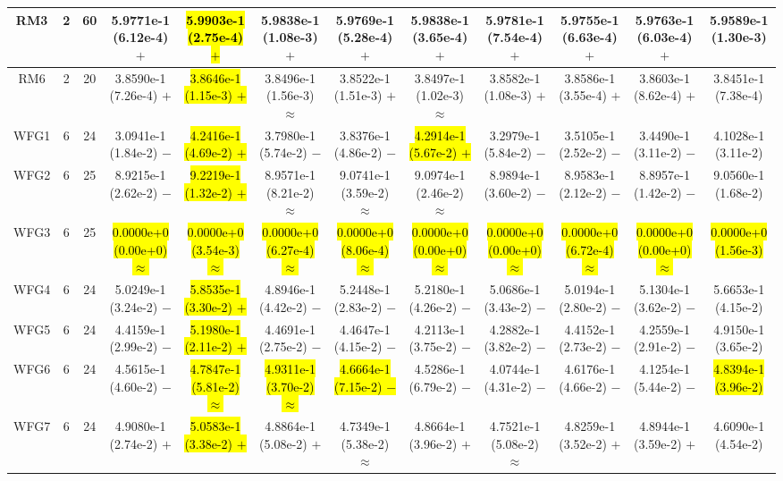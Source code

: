 \documentclass[journal]{IEEEtran}
\begin{document}
\begin{table*}[htbp]
\begin{tabular}{cccccccccccc}
\hline
\multirow{1}{*}{RM3}&2&60&5.9771e-1 (6.12e-4) $+$&\hl{5.9903e-1 (2.75e-4) $+$}&5.9838e-1 (1.08e-3) $+$&5.9769e-1 (5.28e-4) $+$&5.9838e-1 (3.65e-4) $+$&5.9781e-1 (7.54e-4) $+$&5.9755e-1 (6.63e-4) $+$&5.9763e-1 (6.03e-4) $+$&5.9589e-1 (1.30e-3)\\
\hline
\multirow{1}{*}{RM6}&2&20&3.8590e-1 (7.26e-4) $+$&\hl{3.8646e-1 (1.15e-3) $+$}&3.8496e-1 (1.56e-3) $\approx$&3.8522e-1 (1.51e-3) $+$&3.8497e-1 (1.02e-3) $\approx$&3.8582e-1 (1.08e-3) $+$&3.8586e-1 (3.55e-4) $+$&3.8603e-1 (8.62e-4) $+$&3.8451e-1 (7.38e-4)\\
\hline
\multirow{1}{*}{WFG1}&6&24&3.0941e-1 (1.84e-2) $-$&\hl{4.2416e-1 (4.69e-2) $+$}&3.7980e-1 (5.74e-2) $-$&3.8376e-1 (4.86e-2) $-$&\hl{4.2914e-1 (5.67e-2) $+$}&3.2979e-1 (5.84e-2) $-$&3.5105e-1 (2.52e-2) $-$&3.4490e-1 (3.11e-2) $-$&4.1028e-1 (3.11e-2)\\
\hline
\multirow{1}{*}{WFG2}&6&25&8.9215e-1 (2.62e-2) $-$&\hl{9.2219e-1 (1.32e-2) $+$}&8.9571e-1 (8.21e-2) $\approx$&9.0741e-1 (3.59e-2) $\approx$&9.0974e-1 (2.46e-2) $\approx$&8.9894e-1 (3.60e-2) $-$&8.9583e-1 (2.12e-2) $-$&8.8957e-1 (1.42e-2) $-$&9.0560e-1 (1.68e-2)\\
\hline
\multirow{1}{*}{WFG3}&6&25&\hl{0.0000e+0 (0.00e+0) $\approx$}&\hl{0.0000e+0 (3.54e-3) $\approx$}&\hl{0.0000e+0 (6.27e-4) $\approx$}&\hl{0.0000e+0 (8.06e-4) $\approx$}&\hl{0.0000e+0 (0.00e+0) $\approx$}&\hl{0.0000e+0 (0.00e+0) $\approx$}&\hl{0.0000e+0 (6.72e-4) $\approx$}&\hl{0.0000e+0 (0.00e+0) $\approx$}&\hl{0.0000e+0 (1.56e-3)}\\
\hline
\multirow{1}{*}{WFG4}&6&24&5.0249e-1 (3.24e-2) $-$&\hl{5.8535e-1 (3.30e-2) $+$}&4.8946e-1 (4.42e-2) $-$&5.2448e-1 (2.83e-2) $-$&5.2180e-1 (4.26e-2) $-$&5.0686e-1 (3.43e-2) $-$&5.0194e-1 (2.80e-2) $-$&5.1304e-1 (3.62e-2) $-$&5.6653e-1 (4.15e-2)\\
\hline
\multirow{1}{*}{WFG5}&6&24&4.4159e-1 (2.99e-2) $-$&\hl{5.1980e-1 (2.11e-2) $+$}&4.4691e-1 (2.75e-2) $-$&4.4647e-1 (4.15e-2) $-$&4.2113e-1 (3.75e-2) $-$&4.2882e-1 (3.82e-2) $-$&4.4152e-1 (2.73e-2) $-$&4.2559e-1 (2.91e-2) $-$&4.9150e-1 (3.65e-2)\\
\hline
\multirow{1}{*}{WFG6}&6&24&4.5615e-1 (4.60e-2) $-$&\hl{4.7847e-1 (5.81e-2) $\approx$}&\hl{4.9311e-1 (3.70e-2) $\approx$}&\hl{4.6664e-1 (7.15e-2) $-$}&4.5286e-1 (6.79e-2) $-$&4.0744e-1 (4.31e-2) $-$&4.6176e-1 (4.66e-2) $-$&4.1254e-1 (5.44e-2) $-$&\hl{4.8394e-1 (3.96e-2)}\\
\hline
\multirow{1}{*}{WFG7}&6&24&4.9080e-1 (2.74e-2) $+$&\hl{5.0583e-1 (3.38e-2) $+$}&4.8864e-1 (5.08e-2) $+$&4.7349e-1 (5.38e-2) $\approx$&4.8664e-1 (3.96e-2) $+$&4.7521e-1 (5.08e-2) $\approx$&4.8259e-1 (3.52e-2) $+$&4.8944e-1 (3.59e-2) $+$&4.6090e-1 (4.54e-2)\\

\end{tabular}
\end{table*}
\end{document}

